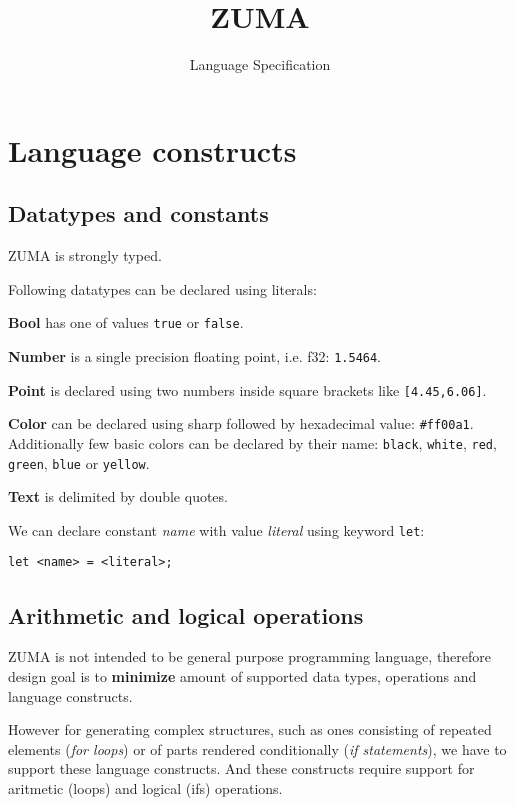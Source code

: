\documentclass{scrreprt}
\title{ZUMA}
\subtitle{Language Specification}
\date{}
\author{}
\newcommand{\zuma}{ZUMA}
\begin{document}

\maketitle

\tableofcontents

\newpage



\chapter{Language constructs}

\section{Datatypes and constants}

\zuma{} is strongly typed.

Following datatypes can be declared using literals:

\textbf{Bool} has one of values \texttt{true} or \texttt{false}.

\textbf{Number} is a single precision floating point, i.e. f32: \texttt{1.5464}.

\textbf{Point} is declared using two numbers inside square brackets like \texttt{[4.45,6.06]}.

\textbf{Color} can be declared using sharp followed by hexadecimal value: \texttt{\#ff00a1}. Additionally few basic colors can be declared by their name: \texttt{black}, \texttt{white}, \texttt{red}, \texttt{green}, \texttt{blue} or \texttt{yellow}.

\textbf{Text} is delimited by double quotes.

We can declare constant \textit{name} with value \textit{literal} using keyword \texttt{let}:

\texttt{let <name> = <literal>;}


\section{Arithmetic and logical operations}

\zuma{} is not intended to be general purpose programming language, therefore design goal is to \textbf{minimize} amount of supported data types, operations and language constructs.

However for generating complex structures, such as ones consisting of repeated elements (\textit{for loops}) or of parts rendered conditionally (\textit{if statements}), we have to support these language constructs. And these constructs require support for aritmetic (loops) and logical (ifs) operations.
\end{document}
